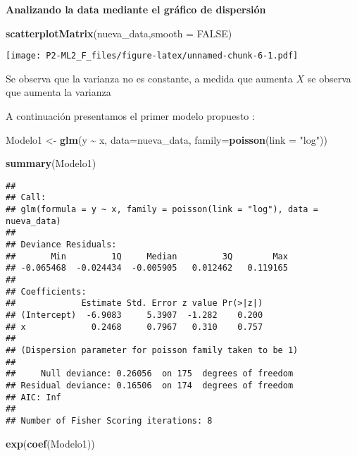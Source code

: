 \documentclass[]{article}
\newenvironment{Shaded}{\begin{snugshade}}{\end{snugshade}}
\newcommand{\DataTypeTok}[1]{\textcolor[rgb]{0.13,0.29,0.53}{#1}}
\newcommand{\KeywordTok}[1]{\textcolor[rgb]{0.13,0.29,0.53}{\textbf{#1}}}
\newcommand{\NormalTok}[1]{#1}
\newcommand{\OperatorTok}[1]{\textcolor[rgb]{0.81,0.36,0.00}{\textbf{#1}}}
\newcommand{\OtherTok}[1]{\textcolor[rgb]{0.56,0.35,0.01}{#1}}
\newcommand{\StringTok}[1]{\textcolor[rgb]{0.31,0.60,0.02}{#1}}
\begin{document}
\textbf{Analizando la data mediante el gráfico de dispersión}

\begin{Shaded}
\begin{Highlighting}[]
\KeywordTok{scatterplotMatrix}\NormalTok{(nueva\_data,}\DataTypeTok{smooth =} \OtherTok{FALSE}\NormalTok{)}
\end{Highlighting}
\end{Shaded}

\texttt{[image: P2-ML2\_F\_files/figure-latex/unnamed-chunk-6-1.pdf]}

Se observa que la varianza no es constante, a medida que aumenta \(X\)
se observa que aumenta la varianza

A continuación presentamos el primer modelo propuesto :

\begin{Shaded}
\begin{Highlighting}[]
\NormalTok{Modelo1 <{-}}\StringTok{ }\KeywordTok{glm}\NormalTok{(y }\OperatorTok{\textasciitilde{}}\StringTok{ }\NormalTok{x, }\DataTypeTok{data=}\NormalTok{nueva\_data, }\DataTypeTok{family=}\KeywordTok{poisson}\NormalTok{(}\DataTypeTok{link =} \StringTok{"log"}\NormalTok{))}
\end{Highlighting}
\end{Shaded}

\begin{Shaded}
\begin{Highlighting}[]
\KeywordTok{summary}\NormalTok{(Modelo1)}
\end{Highlighting}
\end{Shaded}

\begin{verbatim}
## 
## Call:
## glm(formula = y ~ x, family = poisson(link = "log"), data = nueva_data)
## 
## Deviance Residuals: 
##       Min         1Q     Median         3Q        Max  
## -0.065468  -0.024434  -0.005905   0.012462   0.119165  
## 
## Coefficients:
##             Estimate Std. Error z value Pr(>|z|)
## (Intercept)  -6.9083     5.3907  -1.282    0.200
## x             0.2468     0.7967   0.310    0.757
## 
## (Dispersion parameter for poisson family taken to be 1)
## 
##     Null deviance: 0.26056  on 175  degrees of freedom
## Residual deviance: 0.16506  on 174  degrees of freedom
## AIC: Inf
## 
## Number of Fisher Scoring iterations: 8
\end{verbatim}

\begin{Shaded}
\begin{Highlighting}[]
\KeywordTok{exp}\NormalTok{(}\KeywordTok{coef}\NormalTok{(Modelo1))}
\end{Highlighting}
\end{Shaded}
\end{document}
